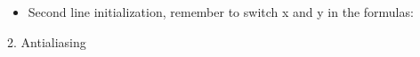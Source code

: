 \documentclass{article}
\begin{document}
\begin{itemize}
\item Second line initialization, remember to switch x and y in the formulas: 
\end{itemize}

2. Antialiasing
\end{document}
